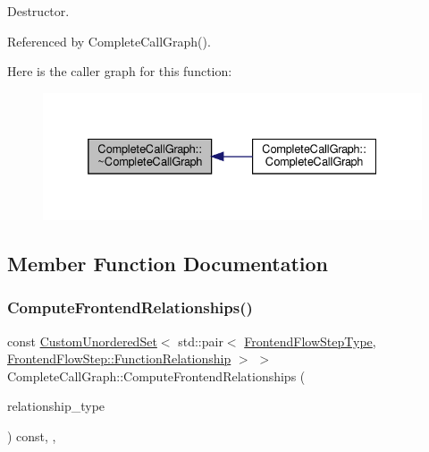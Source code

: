 Destructor. 



Referenced by Complete\+Call\+Graph().

Here is the caller graph for this function\+:
\nopagebreak
\begin{figure}[H]
\begin{center}
\leavevmode
\includegraphics[width=332pt]{d9/d4b/classCompleteCallGraph_a48c3b935dcb84869759b7ee9c3e293bb_icgraph}
\end{center}
\end{figure}


\subsection{Member Function Documentation}
\mbox{\label{classCompleteCallGraph_a617bb88d81ead716f36a849ed06cc0ea}} 
\subsubsection{\texorpdfstring{Compute\+Frontend\+Relationships()}{ComputeFrontendRelationships()}}
{\footnotesize\ttfamily const \hyperlink{classCustomUnorderedSet}{Custom\+Unordered\+Set}$<$ std\+::pair$<$ \hyperlink{frontend__flow__step_8hpp_afeb3716c693d2b2e4ed3e6d04c3b63bb}{Frontend\+Flow\+Step\+Type}, \hyperlink{classFrontendFlowStep_af7cf30f2023e5b99e637dc2058289ab0}{Frontend\+Flow\+Step\+::\+Function\+Relationship} $>$ $>$ Complete\+Call\+Graph\+::\+Compute\+Frontend\+Relationships (\begin{DoxyParamCaption}\item[{const \hyperlink{classDesignFlowStep_a723a3baf19ff2ceb77bc13e099d0b1b7}{Design\+Flow\+Step\+::\+Relationship\+Type}}]{relationship\+\_\+type }\end{DoxyParamCaption}) const\hspace{0.3cm}{\ttfamily [override]}, {\ttfamily [private]}, {\ttfamily [virtual]}}



